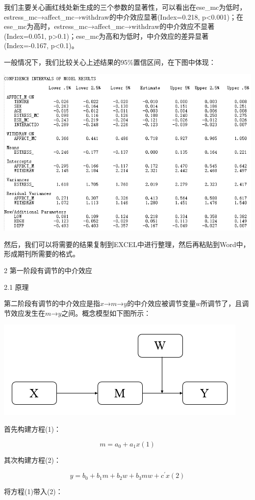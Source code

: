 \documentclass[
]{book}
\begin{document}
我们主要关心画红线处新生成的三个参数的显著性，可以看出在ese\_mc为低时，estress\_mc→affect\_mc→withdraw的中介效应显著(Index=0.218, p\textless0.001)；在ese\_mc为高时，estress\_mc→affect\_mc→withdraw的中介效应不显著(Index=0.051, p\textgreater0.1)；ese\_mc为高和为低时，中介效应的差异显著(Index=-0.167, p\textless0.1)。

一般情况下，我们比较关心上述结果的95\%置信区间，在下图中体现：

\includegraphics{figs/1144.png}

然后，我们可以将需要的结果复制到EXCEL中进行整理，然后再粘贴到Word中，形成期刊所需要的格式。

2 第一阶段有调节的中介效应

2.1 原理

第二阶段有调节的中介效应是指\(x\)→\(m\)→\(y\)的中介效应被调节变量\(w\)所调节了，且调节效应发生在\(m\)→\(y\)之间。概念模型如下图所示：

\includegraphics{figs/1145.png}

首先构建方程(1)：

\[
m=a_{0}+a_{1}x(1)
\]

其次构建方程(2)：

\[
y=b_{0}+b_{1}m+b_{2}w+b_{3}mw+c^{'}x(2)
\]

将方程(1)带入(2)：
\end{document}
